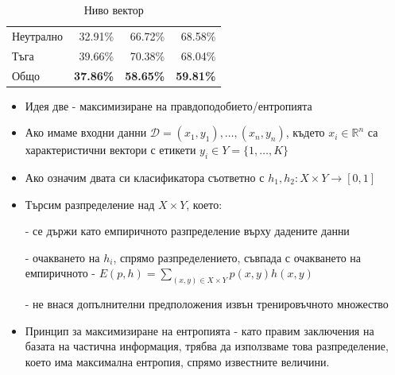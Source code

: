 \documentclass[9pt]{beamer}
\begin{document}
\begin{frame}[t]
\begin{table}[h]
\begin{center}
{\begin{tabular}{|l|r r r|}
                    Неутрално & 32.91\%           & 66.72\%          & 68.58\%          \\
                    Тъга      & 39.66\%          & 70.38\%          & 68.04\%          \\
                    \hline
                    \hline
                    Общо      & \textbf{37.86\%} & \textbf{58.65\%} & \textbf{59.81\%} \\
                    \hline
                \end{tabular}}
                \caption*{Ниво вектор}
            \end{center}
        \end{table}
    \end{frame}

    \begin{frame}[t]
        \begin{itemize}
            \setlength\itemsep{\fill}
            \item Идея две
            \pause - максимизиране на правдоподобието/ентропията
            \pause
            \item Ако имаме входни данни $\mathcal{D} = (x_1, y_1),\ldots,(x_n, y_n)$, където $x_i \in \mathbb{R}^n$ са характеристични вектори с етикети $y_i \in Y=\{1,\ldots, K\}$
            \pause
            \item Ако означим двата си класификатора съответно с $h_1, h_2: X\times Y \rightarrow [0, 1]$
            \pause
            \item Търсим разпределение над $X\times Y$, което:
            
            \pause - се държи като емпиричното разпределение върху дадените данни
            
            \pause - очакването на $h_i$, спрямо разпределението, съвпада с очакването на емпиричното
            \pause - $E(p, h) = \sum\limits_{(x, y) \in X\times Y} p(x, y)h(x, y)$

            \pause - не внася допълнителни предположения извън тренировъчното множество
            \pause
            \item Принцип за максимизиране на ентропията
            \pause - като правим заключения на базата на частична информация, трябва да използваме това разпределение, което има максимална ентропия, спрямо известните величини.
        \end{itemize}
    \end{frame}
\end{document}
